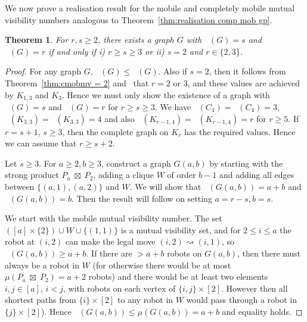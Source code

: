 \documentclass[a4paper,12pt]{article}
\DeclareMathOperator{\strongprod}{\,\boxtimes\,}
\DeclareMathOperator{\mobmv}{Mob_{\mu}}
\DeclareMathOperator{\cmobmv}{Mob^*_{\mu}}
\newtheorem{theorem}{Theorem}[section]
\theoremstyle{definition}
\newcommand{\move}{\rightsquigarrow}
\begin{document}
	We now prove a realisation result for the mobile and completely mobile mutual visibility numbers analogous to Theorem~\ref{thm:realisation comp mob gp}. 
	
	\begin{theorem}\label{cmobmvlower}
		For $r,s \geq 2$, there exists a graph $G$ with $\cmobmv(G) = s$ and $\mobmv(G) = r$ if and only if i) $r \geq s \geq 3$ or ii) $s = 2$ and $r \in \{ 2,3\} $.
	\end{theorem}
	\begin{proof}
		For any graph $G$, $\cmobmv (G) \leq \mobmv (G)$. Also if $s = 2$, then it follows from Theorem~\ref{thm:cmobmv = 2} and~\cite[Corollary 3.3]{dettlaff2024} that $r = 2$ or $3$, and these values are achieved by $K_{1,3}$ and $K_3$. Hence we must only show the existence of a graph with $\cmobmv(G) = s$ and $\mobmv(G) = r$ for $r \geq s \geq 3$. We have $\cmobmv (C_4) = \mobmv (C_4) = 3$, $\cmobmv (K_{3,3}) = \mobmv (K_{3,3}) = 4$ and also $\cmobmv (K_{r-1,4}) = \mobmv (K_{r-1,4}) = r$ for $r \geq 5$. If $r = s+1$, $s \geq 3$, then the complete graph on $K_r$ has the required values. Hence we can assume that $r \geq s+2$.
		
		Let $s \geq 3$. For $a \geq 2, b \geq 3$, construct a graph $G(a,b)$ by starting with the strong product $P_{a} \strongprod P_2$, adding a clique $W$ of order $b-1$ and adding all edges between $\{ (a,1),(a,2)\} $ and $W$. We will show that $\mobmv (G(a,b)) = a+b$ and $\cmobmv (G(a,b)) = b$. Then the result will follow on setting $a = r-s,b = s$. 
		
		We start with the mobile mutual visibility number. The set $([a] \times \{ 2\} ) \cup W \cup \{ (1,1)\} $ is a mutual visibility set, and for $2 \leq i \leq a$ the robot at $(i,2)$ can make the legal move $(i,2) \move (i,1)$, so $\mobmv (G(a,b)) \geq a+b$. If there are $> a+b$ robots on $G(a,b)$, then there must always be a robot in $W$ (for otherwise there would be at most $\mu (P_a \strongprod P_2) = a+2$ robots) and there would be at least two elements $i,j \in [a]$, $i < j$, with robots on each vertex of $\{ i,j\} \times [2]$. However then all shortest paths from $\{ i\} \times [2]$ to any robot in $W$ would pass through a robot in $\{ j\} \times [2]$).  Hence $\mobmv (G(a,b)) \leq \mu (G(a,b)) = a+b$ and equality holds. 
		

\end{proof}
\end{document}
